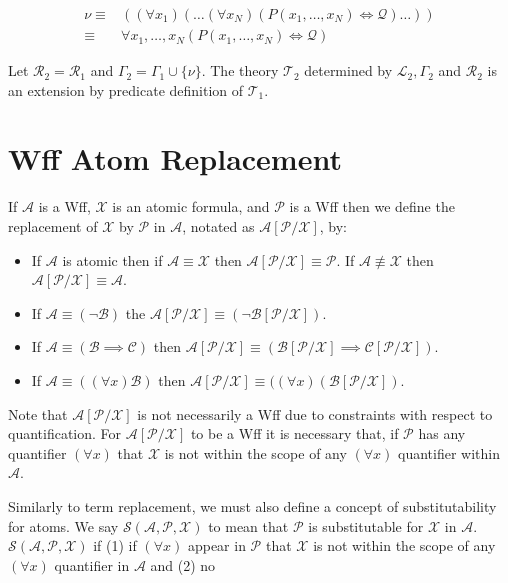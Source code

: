\documentclass[12pt]{article}
\theoremstyle{break}
\theoremstyle{break}
\theoremstyle{break}
\theoremstyle{break}
\theoremstyle{break}
\newtheorem{informal definition}[definition]{Informal Definition}
\newcommand{\mc}[1]{\mathcal{#1}}
\begin{document}
\begin{align*}
\nu \equiv& ((\forall x_1) (\ldots (\forall x_N) (P(x_1, \ldots, x_N) \iff \mc{Q}) \ldots ))\\
\equiv& \forall x_1,\ldots,x_N (P(x_1, \ldots, x_N) \iff \mc{Q})
\end{align*}

Let $\mc{R}_2 = \mc{R}_1$ and $\Gamma_2 = \Gamma_1 \cup \{\nu\}$.
The theory $\mc{T}_2$ determined by $\mc{L}_2, \Gamma_2$ and $\mc{R}_2$ is an extension by predicate definition of $\mc{T}_1$.


\section{Wff Atom Replacement}

If $\mc{A}$ is a Wff, $\mc{X}$ is an atomic formula, and $\mc{P}$ is a Wff then we define the replacement of $\mc{X}$ by $\mc{P}$ in $\mc{A}$, notated as $\mc{A}[\mc{P}/\mc{X}]$, by:

\hrulefill
\begin{itemize}
\item{If $\mc{A}$ is atomic then if $\mc{A}\equiv \mc{X}$ then $\mc{A}[\mc{P}/\mc{X}] \equiv \mc{P}$. If $\mc{A}\not\equiv \mc{X}$ then $\mc{A}[\mc{P}/\mc{X}] \equiv \mc{A}$.}
\item{If $\mc{A} \equiv (\lnot \mc{B})$ the $\mc{A}[\mc{P}/\mc{X}] \equiv (\lnot \mc{B}[\mc{P}/\mc{X}])$.}
\item{If $\mc{A} \equiv (\mc{B} \implies \mc{C})$ then $\mc{A}[\mc{P}/\mc{X}] \equiv (\mc{B}[\mc{P}/\mc{X}] \implies \mc{C}[\mc{P}/\mc{X}])$.}
\item{If $\mc{A} \equiv ((\forall x)\mc{B})$ then $\mc{A}[\mc{P}/\mc{X}] \equiv ((\forall x) (\mc{B}[\mc{P}/\mc{X}])$.}
\end{itemize}
\hrulefill

Note that $\mc{A}[\mc{P}/\mc{X}]$ is not necessarily a Wff due to constraints with respect to quantification.
For $\mc{A}[\mc{P}/\mc{X}]$ to be a Wff it is necessary that, if $\mc{P}$ has any quantifier $(\forall x)$ that $\mc{X}$ is not within the scope of any $(\forall x)$ quantifier within $\mc{A}$.

Similarly to term replacement, we must also define a concept of substitutability for atoms. We say $\mc{S}(\mc{A}, \mc{P}, \mc{X})$ to mean that $\mc{P}$ is substitutable for $\mc{X}$ in $\mc{A}$. $\mc{S}(\mc{A}, \mc{P}, \mc{X})$ if (1) if $(\forall x)$ appear in $\mc{P}$ that $\mc{X}$ is not within the scope of any $(\forall x)$ quantifier in $\mc{A}$ and (2) no
\end{document}

